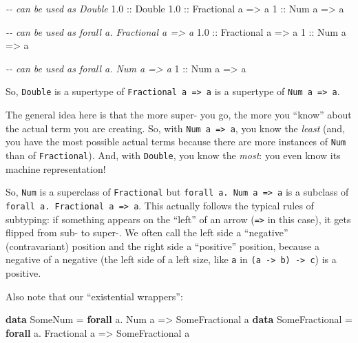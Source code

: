 \documentclass[]{article}
\newenvironment{Shaded}{}{}
\newcommand{\CommentTok}[1]{\textcolor[rgb]{0.38,0.63,0.69}{\textit{#1}}}
\newcommand{\DataTypeTok}[1]{\textcolor[rgb]{0.56,0.13,0.00}{#1}}
\newcommand{\DecValTok}[1]{\textcolor[rgb]{0.25,0.63,0.44}{#1}}
\newcommand{\FloatTok}[1]{\textcolor[rgb]{0.25,0.63,0.44}{#1}}
\newcommand{\KeywordTok}[1]{\textcolor[rgb]{0.00,0.44,0.13}{\textbf{#1}}}
\newcommand{\NormalTok}[1]{#1}
\newcommand{\OperatorTok}[1]{\textcolor[rgb]{0.40,0.40,0.40}{#1}}
\newcommand{\OtherTok}[1]{\textcolor[rgb]{0.00,0.44,0.13}{#1}}
\begin{document}
\begin{Shaded}
\begin{Highlighting}[]
\CommentTok{{-}{-} can be used as \textasciigrave{}Double\textasciigrave{}}
\FloatTok{1.0}\OtherTok{ ::} \DataTypeTok{Double}
\FloatTok{1.0}\OtherTok{ ::} \DataTypeTok{Fractional}\NormalTok{ a }\OtherTok{=\textgreater{}}\NormalTok{ a}
\DecValTok{1}\OtherTok{ ::} \DataTypeTok{Num}\NormalTok{ a }\OtherTok{=\textgreater{}}\NormalTok{ a}

\CommentTok{{-}{-} can be used as \textasciigrave{}forall a. Fractional a =\textgreater{} a\textasciigrave{}}
\FloatTok{1.0}\OtherTok{ ::} \DataTypeTok{Fractional}\NormalTok{ a }\OtherTok{=\textgreater{}}\NormalTok{ a}
\DecValTok{1}\OtherTok{ ::} \DataTypeTok{Num}\NormalTok{ a }\OtherTok{=\textgreater{}}\NormalTok{ a}

\CommentTok{{-}{-} can be used as \textasciigrave{}forall a. Num a =\textgreater{} a\textasciigrave{}}
\DecValTok{1}\OtherTok{ ::} \DataTypeTok{Num}\NormalTok{ a }\OtherTok{=\textgreater{}}\NormalTok{ a}
\end{Highlighting}
\end{Shaded}

So, \texttt{Double} is a supertype of \texttt{Fractional\ a\ =\textgreater{}\ a}
is a supertype of \texttt{Num\ a\ =\textgreater{}\ a}.

The general idea here is that the more super- you go, the more you ``know''
about the actual term you are creating. So, with
\texttt{Num\ a\ =\textgreater{}\ a}, you know the \emph{least} (and, you have
the most possible actual terms because there are more instances of \texttt{Num}
than of \texttt{Fractional}). And, with \texttt{Double}, you know the
\emph{most}: you even know its machine representation!

So, \texttt{Num} is a superclass of \texttt{Fractional} but
\texttt{forall\ a.\ Num\ a\ =\textgreater{}\ a} is a subclass of
\texttt{forall\ a.\ Fractional\ a\ =\textgreater{}\ a}. This actually follows
the typical rules of subtyping: if something appears on the ``left'' of an arrow
(\texttt{=\textgreater{}} in this case), it gets flipped from sub- to super-. We
often call the left side a ``negative'' (contravariant) position and the right
side a ``positive'' position, because a negative of a negative (the left side of
a left size, like \texttt{a} in
\texttt{(a\ -\textgreater{}\ b)\ -\textgreater{}\ c}) is a positive.

Also note that our ``existential wrappers'':

\begin{Shaded}
\begin{Highlighting}[]
\KeywordTok{data} \DataTypeTok{SomeNum} \OtherTok{=} \KeywordTok{forall}\NormalTok{ a}\OperatorTok{.} \DataTypeTok{Num}\NormalTok{ a }\OtherTok{=\textgreater{}} \DataTypeTok{SomeFractional}\NormalTok{ a}
\KeywordTok{data} \DataTypeTok{SomeFractional} \OtherTok{=} \KeywordTok{forall}\NormalTok{ a}\OperatorTok{.} \DataTypeTok{Fractional}\NormalTok{ a }\OtherTok{=\textgreater{}} \DataTypeTok{SomeFractional}\NormalTok{ a}
\end{Highlighting}
\end{Shaded}
\end{document}
